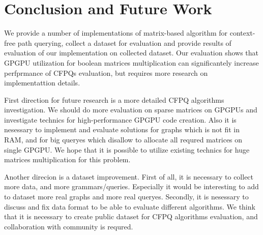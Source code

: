 \section{Conclusion and Future Work}

We provide a number of implementations of matrix-based algorithm for context-free path querying, collect a dataset for evaluation and provide results of evaluation of our implementation on collected dataset.
Our evaluation shows that GPGPU utilization for boolean matrices multiplication can significantely increase perfprmance of CFPQs evaluation, but requires more research on implementattion details.

First direction for future research is a more detailed CFPQ algorithms investigation.
We should do more evaluation on sparse matrices on GPGPUs and investigate technics for high-performance GPGPU code creation.
Also it is nesessary to implement and evaluate solutions for graphs which is not fit in RAM, and for big queryes which disallow to allocate all requred matrices on single GPGPU.
We hope that it is possible to utilize existing technics for huge matrices multiplication for this problem.

Another direcion is a dataset improvement.
First of all, it is necessary to collect more data, and more grammars/queries.
Especially it would be interesting to add to dataset more real graphs and more real queryes.
Secondly, it is nesessary to discuss and fix data format to be able to evaluate different algorithms.
We think that it is necessary to create public dataset for CFPQ algorithms evaluation, and collaboration with community is requred.



